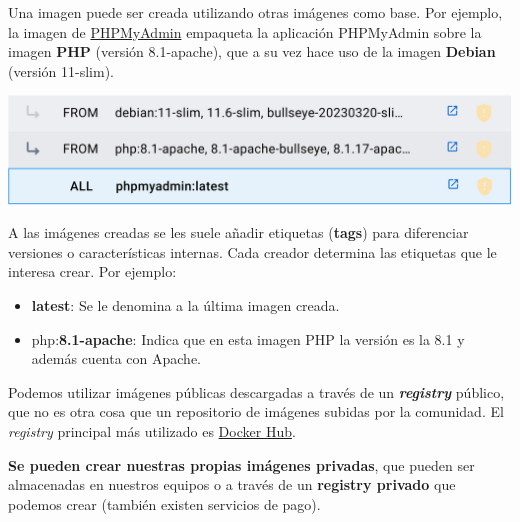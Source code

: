 
Una imagen puede ser creada utilizando otras imágenes como base. Por ejemplo, la imagen de \href{https://hub.docker.com/_/phpmyadmin}{PHPMyAdmin} empaqueta la aplicación PHPMyAdmin sobre la imagen \textbf{PHP} (versión 8.1-apache), que a su vez hace uso de la imagen \textbf{Debian} (versión 11-slim).


\begin{center}
    \includegraphics[width=0.9\linewidth]{img/docker/imagen1.png}
\end{center}

A las imágenes creadas se les suele añadir etiquetas (\textbf{tags}) para diferenciar versiones o características internas. Cada creador determina las etiquetas que le interesa crear. Por ejemplo:
\begin{itemize}
    \item \textbf{latest}: Se le denomina a la última imagen creada.
    \item php:\textbf{8.1-apache}: Indica que en esta imagen PHP la versión es la 8.1 y además cuenta con Apache.
\end{itemize}

Podemos utilizar imágenes públicas descargadas a través de un \textbf{\textit{registry}} público, que no es otra cosa que un repositorio de imágenes subidas por la comunidad. El \textit{registry} principal más utilizado es \href{https://hub.docker.com/}{Docker Hub}.


\textbf{Se pueden crear nuestras propias imágenes privadas}, que pueden ser almacenadas en nuestros equipos o a través de un \textbf{registry privado} que podemos crear (también existen servicios de pago).


